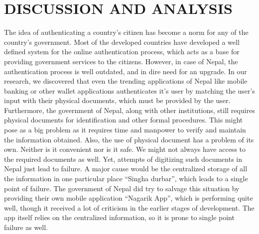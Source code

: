 \chapter{DISCUSSION AND ANALYSIS}






The idea of authenticating a country’s citizen has become a norm for any of the country’s government. Most of the developed countries have developed a well defined system for the online authentication process, which acts as a base for providing government services to the citizens. However, in case of Nepal, the authentication process is well outdated, and in dire need for an upgrade. In our research, we discovered that even the trending applications of Nepal like mobile banking or other wallet applications authenticates it’s user by matching the user’s input
with their physical documents, which must be provided by the user. Furthermore, the government of Nepal, along with other institutions, still requires physical documents for identification and other formal procedures. This might pose as a big problem as it requires time and manpower to verify and maintain the information obtained. Also, the use of physical document has a problem of its own. Neither is it convenient nor is it safe. We might not always have access to the required documents as well. Yet, attempts of digitizing such documents in Nepal just lead to failure. A major cause would be the centralized storage of all the information in one particular place “Singha durbar”, which leads to a single point of failure. The government of Nepal did try to salvage this situation by providing their own mobile application “Nagarik App”, which is performing quite well, though it received a lot of criticism in the earlier stages of development. The app itself relies on the centralized information, so it is prone to single point failure as well.

